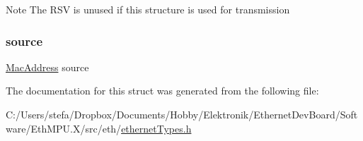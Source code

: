 \begin{DoxyNote}{Note}
The R\+SV is unused if this structure is used for transmission 
\end{DoxyNote}
\mbox{\label{structethernet_frame___ad921b9c440e49b18b551c1c6bda03dcc}} 
\subsubsection{\texorpdfstring{source}{source}}
{\footnotesize\ttfamily \mbox{\hyperlink{ethernet_types_8h_a7fed77396097fa92ca5f4b185844244c}{Mac\+Address}} source}



The documentation for this struct was generated from the following file\+:\begin{DoxyCompactItemize}
\item 
C\+:/\+Users/stefa/\+Dropbox/\+Documents/\+Hobby/\+Elektronik/\+Ethernet\+Dev\+Board/\+Software/\+Eth\+M\+P\+U.\+X/src/eth/\mbox{\hyperlink{ethernet_types_8h}{ethernet\+Types.\+h}}\end{DoxyCompactItemize}
